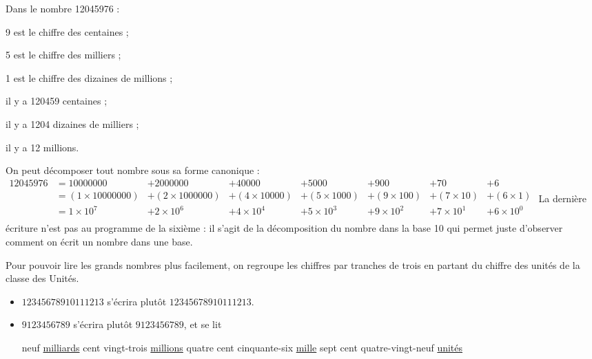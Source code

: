 \begin{exemple*1}
   Dans le nombre \num{12045976} :
   \begin{colitemize}{2}
      \item 9 est le chiffre des centaines ;
      \item 5 est le chiffre des milliers ;
      \item 1 est le chiffre des dizaines de millions ;
      \item il y a \num{120459} centaines ;
      \item il y a \num{1204} dizaines de milliers ;
      \item il y a 12 millions.
   \end{colitemize}
\end{exemple*1}

\begin{remarques}
    On peut décomposer tout nombre sous sa forme canonique : \\
    $\begin{array}{*{8}{l}}
    \num{12045976} & =\num{10000000} & + \num{2000000} & + \num{40000} & + \num{5000} & + 900 & + 70 & + 6 \\
        & =(1\times\num{10000000}) & + (2\times\num{1000000}) & + (4\times\num{10000}) & +(5\times\num{1000}) & +(9\times100) & +(7\times10) & +(6\times1) \\
        & =1\times10^7 & +2\times10^6 & +4\times10^4 & +5\times10^3 & +9\times10^2 & +7\times10^1 & +6\times10^0 \\
    \end{array}$
    La dernière écriture n'est pas au programme de la sixième : il s'agit de la décomposition du nombre dans la base 10 qui permet juste d'observer comment on écrit un nombre dans une base.
\end{remarques}

\begin{propriete}
    Pour pouvoir lire les grands nombres plus facilement, on regroupe les chiffres par tranches de trois en partant du chiffre des unités de la classe des Unités.
\end{propriete}

\begin{exemple*1}
    \begin{itemize}
        \item $12345678910111213$ s'écrira plutôt $\num{12345678910111213}$.
        \item $9123456789$ s'écrira plutôt $\num{9123456789}$, et se lit 
        \begin{center}
            {\footnotesize\og neuf \underline{milliards} cent vingt-trois \underline{millions} quatre cent cinquante-six \underline{mille} sept cent quatre-vingt-neuf \underline{unités} \fg}
        \end{center}
    \end{itemize}
\end{exemple*1}

